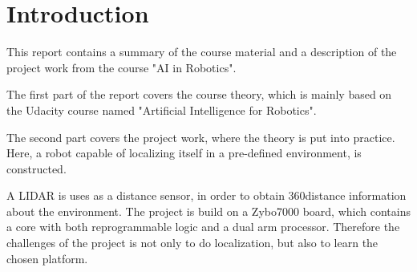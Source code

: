 \documentclass[Main]{subfiles}
\begin{document}
\chapter{Introduction} %
\label{cha:introduction}

This report contains a summary of the course material and a description of the project work from the course "AI in Robotics".

The first part of the report covers the course theory, which is mainly based on the Udacity course named "Artificial Intelligence for Robotics".

The second part covers the project work, where the theory is put into practice.
Here, a robot capable of localizing itself in a pre-defined environment, is constructed.

A LIDAR is uses as a distance sensor, in order to obtain 360\degree distance information about the environment.
The project is build on a Zybo7000 board, which contains a core with both reprogrammable logic and a dual arm processor.
Therefore the challenges of the project is not only to do localization, but also to learn the chosen platform.

\end{document}
